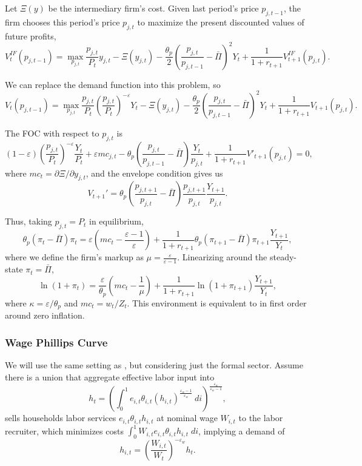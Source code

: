 \documentclass[12pt]{article}
\begin{document}
Let $\Xi(y)$ be the intermediary firm's cost. Given last period's price $p_{j,t-1}$, the
firm chooses this period's price $p_{j,t}$ to maximize the present discounted values of
future profits,
\[
V_t^{IF}(p_{j,t-1}) = \max_{p_{j,t}} \frac{p_{j,t}}{P_t} y_{j,t} - \Xi(y_{j,t})
- \frac{\theta_p}{2} \left( \frac{p_{j,t}}{p_{j,t-1}} - \bar \Pi \right)^2 Y_t
+ \frac{1}{1+r_{t+1}} V_{t+1}^{IF} (p_{j,t}).
\]

We can replace the demand function into this problem, so
\[
V_t(p_{j,t-1}) = \max_{p_{j,t}} \frac{p_{j,t}}{P_t}
\left( \frac{p_{j,t}}{P_t} \right)^{-\varepsilon} Y_t - \Xi(y_{j,t})
- \frac{\theta_p}{2} \left( \frac{p_{j,t}}{p_{j,t-1}} - \bar \Pi \right)^2 Y_t
+ \frac{1}{1+r_{t+1}} V_{t+1} (p_{j,t}).
\]

The FOC with respect to $p_{j,t}$ is
\[
(1-\varepsilon) \left( \frac{p_{j,t}}{P_t} \right)^{-\varepsilon} \frac{Y_t}{P_t}
+ \varepsilon mc_{j,t} - \theta_p \left( \frac{p_{j,t}}{p_{j,t-1}} - \bar \Pi \right)
\frac{Y_t}{p_{j,t}} + \frac{1}{1+r_{t+1}} V'_{t+1}(p_{j,t}) = 0,
\]
where $mc_t = \partial \Xi / \partial y_{j,t}$, and the envelope condition gives us
\[
V_{t+1}' = \theta_p \left( \frac{p_{j,t+1}}{p_{j,t}} - \bar \Pi \right)
\frac{p_{j,t+1}}{p_{j,t}} \frac{Y_{t+1}}{p_{j,t}}.
\]

Thus, taking $p_{j,t} = P_t$ in equilibrium,
\[
\theta_p (\pi_t - \bar \Pi) \pi_t
= \varepsilon \left( mc_t - \frac{\varepsilon-1}{\varepsilon} \right)
+ \frac{1}{1+r_{t+1}} \theta_p (\pi_{t+1} - \bar \Pi) \pi_{t+1} \frac{Y_{t+1}}{Y_t},
\]
where we define the firm's markup as $\mu = \frac{\varepsilon}{\varepsilon-1}$.
Linearizing around the steady-state $\pi_t = \bar \Pi$,
\[
\ln (1+\pi_t)
= \frac{\varepsilon}{\theta_p} \left( mc_t - \frac{1}{\mu} \right)
+ \frac{1}{1+r_{t+1}}\ln (1+\pi_{t+1}) \frac{Y_{t+1}}{Y_t},
\]
where $\kappa = \varepsilon / \theta_p$ and $mc_t = w_t / Z_t$. This environment is
equivalent to \textcite{calvo1983staggered} in first order around zero inflation.


\subsubsection*{Wage Phillips Curve}

We will use the same setting as \textcite{hagedorn2019fiscal}, but considering just the
formal sector. Assume there is a union that aggregate effective labor input into
\[
h_t = \left(
    \int_0^1 e_{i,t} \theta_{i,t} (h_{i,t})^\frac{\varepsilon_w-1}{\varepsilon_w} \: di 
\right)^\frac{\varepsilon_w}{\varepsilon_w-1},
\]
sells households labor services $e_{i,t} \theta_{i,t} h_{i,t}$ at nominal wage $W_{i,t}$
to the labor recruiter, which minimizes costs
$\int_0^1 W_{i,t} e_{i,t} \theta_{i,t} h_{i,t} \; di$, implying a demand of
\[
h_{i,t} = \left( \frac{W_{i,t}}{W_t} \right)^{-\varepsilon_w} h_t.
\]
\end{document}
